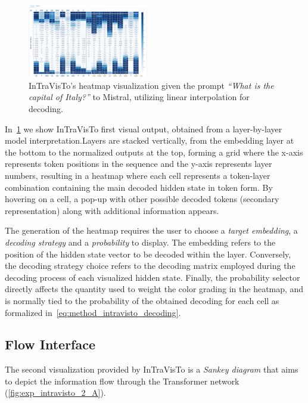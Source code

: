 \documentclass[11pt,a4paper,twocolumn]{article}
\begin{document}
\begin{figure}[tbh!]
    \centering
    \includegraphics[width=0.47\textwidth]{exp_intravisto_1A_heatmap.png}
    \caption{InTraVisTo's heatmap visualization given the prompt \emph{``What is the capital of Italy?''} to Mistral, utilizing linear interpolation for decoding.}
    \label{fig:exp_intravisto_1_A}
\end{figure}

In~\cref{fig:exp_intravisto_1_A} we show InTraVisTo first visual output, obtained from a layer-by-layer model interpretation.Layers are stacked vertically, from the embedding layer at the bottom to the normalized outputs at the top, forming a grid where the x-axis represents token positions in the sequence and the y-axis represents layer numbers, resulting in a heatmap where each cell represents a token-layer combination containing the main decoded hidden state in token form.
By hovering on a cell, a pop-up with other possible decoded tokens (secondary representation) along with additional information appears.

The generation of the heatmap requires the user to choose a \emph{target embedding}, a \emph{decoding strategy} and a \emph{probability} to display.
The embedding refers to the position of the hidden state vector to be decoded within the layer.
Conversely, the decoding strategy choice refers to the decoding matrix employed during the decoding process of each visualized hidden state.
Finally, the probability selector directly affects the quantity used to weight the color grading in the heatmap, and is normally tied to the probability of the obtained decoding for each cell as formalized in~\cref{eq:method_intravisto_decoding}.

\subsection{Flow Interface}

The second visualization provided by InTraVisTo is a \emph{Sankey diagram} that aims to depict the information flow through the Transformer network (\cref{fig:exp_intravisto_2_A}).
\end{document}

